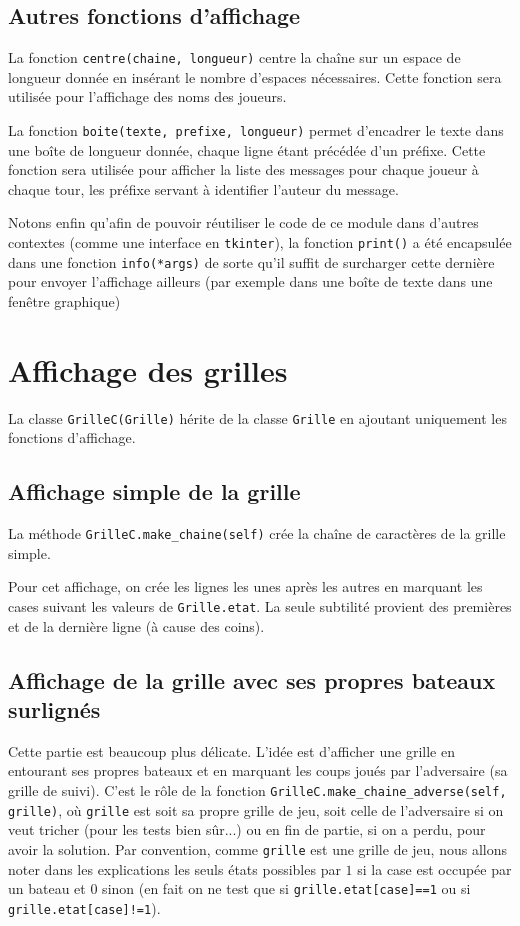 \subsection{Autres fonctions d'affichage}
La fonction \texttt{centre(chaine, longueur)} centre la chaîne sur un espace de longueur donnée en insérant le nombre d'espaces nécessaires. Cette fonction sera utilisée pour l'affichage des noms des joueurs.

La fonction \texttt{boite(texte, prefixe, longueur)} permet d'encadrer le texte dans une boîte de longueur donnée, chaque ligne étant précédée d'un préfixe. Cette fonction sera utilisée pour afficher la liste des messages pour chaque joueur à chaque tour, les préfixe servant à identifier l'auteur du message.

Notons enfin qu'afin de pouvoir réutiliser le code de ce module dans d'autres contextes (comme une interface en \texttt{tkinter}), la fonction \texttt{print()} a été encapsulée dans une fonction \texttt{info(*args)} de sorte qu'il suffit de surcharger cette dernière pour envoyer l'affichage ailleurs (par exemple dans une boîte de texte dans une fenêtre graphique)

\section{Affichage des grilles}
La classe \texttt{GrilleC(Grille)} hérite de la classe \texttt{Grille} en ajoutant uniquement les fonctions d'affichage.

\subsection{Affichage simple de la grille}
La méthode \texttt{GrilleC.make\_chaine(self)} crée la chaîne de caractères de la grille simple. 

Pour cet affichage, on crée les lignes les unes après les autres en marquant les cases suivant les valeurs de \texttt{Grille.etat}. La seule subtilité provient des premières et de la dernière ligne (à cause des coins).


\subsection{Affichage de la grille avec ses propres bateaux surlignés}
Cette partie est beaucoup plus délicate. L'idée est d'afficher une grille en entourant ses propres bateaux et en marquant les coups joués par l'adversaire (sa grille de suivi). C'est le rôle de la fonction \texttt{GrilleC.make\_chaine\_adverse(self, grille)}, où \texttt{grille} est soit sa propre grille de jeu, soit celle de l'adversaire si on veut tricher (pour les tests bien sûr...) ou en fin de partie, si on a perdu, pour avoir la solution. Par convention, comme \texttt{grille} est une grille de jeu, nous allons noter dans les explications les seuls états possibles par $1$ si la case est occupée par un bateau et $0$ sinon (en fait on ne test que si \texttt{grille.etat[case]==1} ou si \texttt{grille.etat[case]!=1}).

